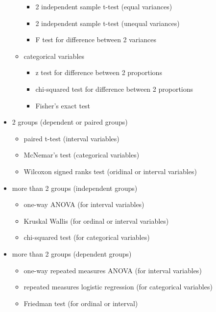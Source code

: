 \documentclass[]{book}
\providecommand{\tightlist}{%
  \setlength{\itemsep}{0pt}\setlength{\parskip}{0pt}}
\begin{document}
\begin{itemize}
\begin{itemize}
    \begin{itemize}
    \tightlist
    \item
      2 independent sample t-test (equal variances)
    \item
      2 independent sample t-test (unequal variances)
    \item
      F test for difference between 2 variances
    \end{itemize}
  \item
    categorical variables

    \begin{itemize}
    \tightlist
    \item
      z test for difference between 2 proportions
    \item
      chi-squared test for difference between 2 proportions
    \item
      Fisher's exact test
    \end{itemize}
  \end{itemize}
\item
  2 groups (dependent or paired groups)

  \begin{itemize}
  \tightlist
  \item
    paired t-test (interval variables)
  \item
    McNemar's test (categorical variables)
  \item
    Wilcoxon signed ranks test (oridinal or interval variables)
  \end{itemize}
\item
  more than 2 groups (independent groups)

  \begin{itemize}
  \tightlist
  \item
    one-way ANOVA (for interval variables)
  \item
    Kruskal Wallis (for ordinal or interval variables)
  \item
    chi-squared test (for categorical variables)
  \end{itemize}
\item
  more than 2 groups (dependent groups)

  \begin{itemize}
  \tightlist
  \item
    one-way repeated measures ANOVA (for interval variables)
  \item
    repeated measures logistic regression (for categorical variables)
  \item
    Friedman test (for ordinal or interval)
  \end{itemize}
\end{itemize}
\end{document}
